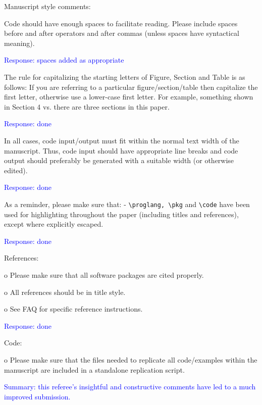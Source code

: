 \documentclass[12pt]{article}
\begin{document}
Manuscript style comments:

Code should have enough spaces to facilitate reading.  Please include
spaces before and after operators and after commas (unless spaces have
syntactical meaning).

\textcolor{blue}{Response: spaces added as appropriate}

The rule for capitalizing the starting letters of Figure, Section and
Table is as follows: If you are referring to a particular
figure/section/table then capitalize the first letter, otherwise use a
lower-case first letter. For example, something shown in Section 4
vs. there are three sections in this paper.

\textcolor{blue}{Response: done}

In all cases, code input/output must fit within the normal text
width of the manuscript.  Thus, code input should have appropriate
line breaks and code output should preferably be generated with a
suitable width (or otherwise edited).

\textcolor{blue}{Response: done}

As a reminder, please make sure that: - \verb+\proglang, \pkg+ and
\verb+\code+ have been used for highlighting throughout the paper
(including titles and references), except where explicitly escaped.

\textcolor{blue}{Response: done}

References:



o Please make sure that all software packages are cited properly.

o All references should be in title style.

o See FAQ for specific reference instructions.


\textcolor{blue}{Response: done}

Code:

o Please make sure that the files needed to replicate all
code/examples within the manuscript are included in a standalone
replication script.


\textcolor{blue}{Summary: this referee's insightful and
  constructive comments have led to a much improved submission.}
\end{document}
